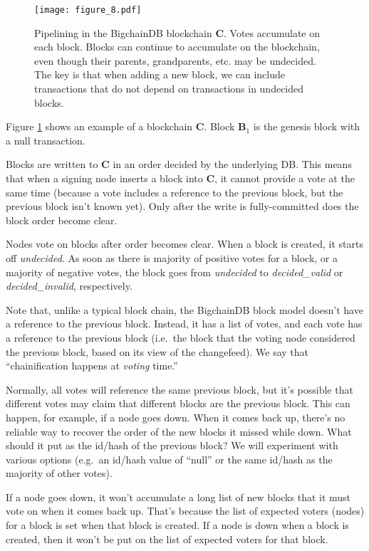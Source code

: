 \begin{figure}[!ht]
  \centering
  \texttt{[image: figure\_8.pdf]}
  \caption{Pipelining in the BigchainDB blockchain $\mathbf{C}$.
  Votes accumulate on each block.
  Blocks can continue to accumulate on the blockchain, even though their parents, grandparents, etc. may be undecided.
  The key is that when adding a new block, we can include transactions that do not depend on transactions in undecided blocks.}
  \label{fig:bigchaindb_chain_pipelining}
\end{figure}

Figure \ref{fig:bigchaindb_chain_pipelining} shows an example of a blockchain $\mathbf{C}$.
Block $\mathbf{B}_1$ is the genesis block with a null transaction.

Blocks are written to $\mathbf{C}$ in an order decided by the underlying DB.
This means that when a signing node inserts a block into $\mathbf{C}$, it cannot provide a vote at the same time (because a vote includes a reference to the previous block, but the previous block isn't known yet).
Only after the write is fully-committed does the block order become clear. 

Nodes vote on blocks after order becomes clear.
When a block is created, it starts off \textsf{\textit{undecided}}.
As soon as there is majority of positive votes for a block, or a majority of negative votes, the block goes from \textsf{\textit{undecided}} to \textsf{\textit{decided\_valid}} or \textsf{\textit{decided\_invalid}}, respectively.

Note that, unlike a typical block chain, the BigchainDB block model doesn't have a reference to the previous block.
Instead, it has a list of votes, and each vote has a reference to the previous block (i.e.~the block that the voting node considered the previous block, based on its view of the changefeed). We say that ``chainification happens at \textit{voting} time.''

Normally, all votes will reference the same previous block, but it's possible that different votes may claim that different blocks are the previous block. This can happen, for example, if a node goes down. When it comes back up, there's no reliable way to recover the order of the new blocks it missed while down. What should it put as the id/hash of the previous block? We will experiment with various options (e.g.~an id/hash value of ``null'' or the same id/hash as the majority of other votes).

If a node goes down, it won't accumulate a long list of new blocks that it must vote on when it comes back up. That's because the list of expected voters (nodes) for a block is set when that block is created. If a node is down when a block is created, then it won't be put on the list of expected voters for that block.

